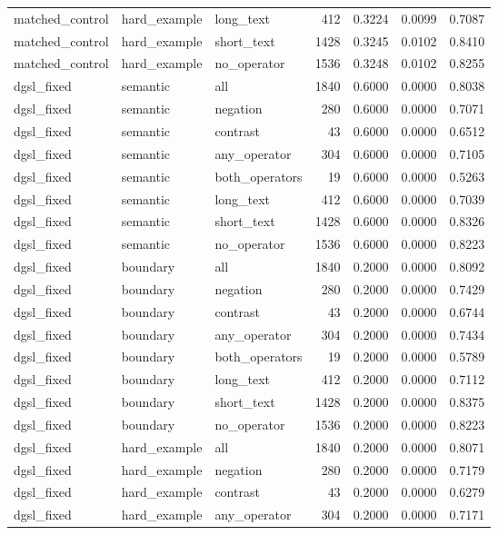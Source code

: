 \begin{tabular}{lllrrrr}
matched\_control & hard\_example & long\_text & 412 & 0.3224 & 0.0099 & 0.7087 \\
matched\_control & hard\_example & short\_text & 1428 & 0.3245 & 0.0102 & 0.8410 \\
matched\_control & hard\_example & no\_operator & 1536 & 0.3248 & 0.0102 & 0.8255 \\
dgsl\_fixed & semantic & all & 1840 & 0.6000 & 0.0000 & 0.8038 \\
dgsl\_fixed & semantic & negation & 280 & 0.6000 & 0.0000 & 0.7071 \\
dgsl\_fixed & semantic & contrast & 43 & 0.6000 & 0.0000 & 0.6512 \\
dgsl\_fixed & semantic & any\_operator & 304 & 0.6000 & 0.0000 & 0.7105 \\
dgsl\_fixed & semantic & both\_operators & 19 & 0.6000 & 0.0000 & 0.5263 \\
dgsl\_fixed & semantic & long\_text & 412 & 0.6000 & 0.0000 & 0.7039 \\
dgsl\_fixed & semantic & short\_text & 1428 & 0.6000 & 0.0000 & 0.8326 \\
dgsl\_fixed & semantic & no\_operator & 1536 & 0.6000 & 0.0000 & 0.8223 \\
dgsl\_fixed & boundary & all & 1840 & 0.2000 & 0.0000 & 0.8092 \\
dgsl\_fixed & boundary & negation & 280 & 0.2000 & 0.0000 & 0.7429 \\
dgsl\_fixed & boundary & contrast & 43 & 0.2000 & 0.0000 & 0.6744 \\
dgsl\_fixed & boundary & any\_operator & 304 & 0.2000 & 0.0000 & 0.7434 \\
dgsl\_fixed & boundary & both\_operators & 19 & 0.2000 & 0.0000 & 0.5789 \\
dgsl\_fixed & boundary & long\_text & 412 & 0.2000 & 0.0000 & 0.7112 \\
dgsl\_fixed & boundary & short\_text & 1428 & 0.2000 & 0.0000 & 0.8375 \\
dgsl\_fixed & boundary & no\_operator & 1536 & 0.2000 & 0.0000 & 0.8223 \\
dgsl\_fixed & hard\_example & all & 1840 & 0.2000 & 0.0000 & 0.8071 \\
dgsl\_fixed & hard\_example & negation & 280 & 0.2000 & 0.0000 & 0.7179 \\
dgsl\_fixed & hard\_example & contrast & 43 & 0.2000 & 0.0000 & 0.6279 \\
dgsl\_fixed & hard\_example & any\_operator & 304 & 0.2000 & 0.0000 & 0.7171 \\

\end{tabular}
